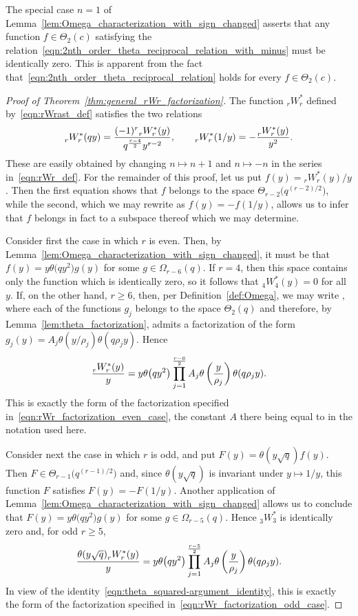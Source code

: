\documentclass[pdftex]{sigma}
\numberwithin{equation}{section}
\begin{document}
\begin{Remark}
The special case $n=1$ of Lemma~\ref{lem:Omega_characterization_with_sign_changed} asserts that any function $f \in \Theta_2(c)$ satisfying the relation~\eqref{eqn:2nth_order_theta_reciprocal_relation_with_minus} must be identically zero. This is apparent from the fact that~\eqref{eqn:2nth_order_theta_reciprocal_relation} holds for every $f \in \Theta_2(c)$.
\end{Remark}

\begin{proof}[Proof of Theorem~\ref{thm:general_rWr_factorization}]
The function $_r^{} W_r^\ast$ defined by~\eqref{eqn:rWrast_def} satisfies the two relations
\[%
_r^{}W_r^\ast(qy) = {(-1)^r {}_r^{}W_r^\ast(y) \over q^{r-4 \over 2} y^{r-2}}, \qquad{} _r^{}W_r^\ast(1/y) = -{ {}_r^{}W_r^\ast(y) \over y^2}.
\]
These are easily obtained by changing $n \mapsto n+1$ and $n \mapsto -n$ in the series in~\eqref{eqn:rWr_def}. For the remainder of this proof, let us put $f(y) = {}_r^{}W_r^\ast(y)/y$. Then the first equation shows that $f$ belongs to the space $\Theta_{r-2}\bigl(q^{(r-2)/2}\bigr)$, while the second, which we may rewrite as $f(y)=-f(1/y)$, allows us to infer that $f$ belongs in fact to a subspace thereof which we may determine.

Consider first the case in which $r$ is even. Then, by Lemma~\ref{lem:Omega_characterization_with_sign_changed}, it must be that $f(y)=y\theta\bigl(qy^2\bigr)g(y)$ for some $g \in \Omega_{r-6}(q)$. If $r=4$, then this space contains only the function which is identically zero, so it follows that $_4^{}W_4^\ast(y)=0$ for all $y$. If, on the other hand, $r \geq 6$, then, per Definition~\ref{def:Omega}, we may write , where each of the functions $g_j$ belongs to the space $\Theta_2(q)$ and therefore, by Lemma~\ref{lem:theta_factorization}, admits a factorization of the form~${g_j(y) = A_j \theta(y/\rho_j)\theta(q\rho_j y)}$. Hence
\[ {_r^{}W_r^\ast(y) \over y} = y\theta\bigl(qy^2\bigr) \prod_{j=1}^{r-6 \over 2} A_j \theta\left({y \over \rho_j}\right)\theta(q\rho_j y). \]
This is exactly the form of the factorization specified in~\eqref{eqn:rWr_factorization_even_case}, the constant $A$ there being equal to  in the notation used here.

Consider next the case in which $r$ is odd, and put $F(y)\! =\! \theta(y\sqrt{q}) f(y)$. Then $F \!\in \!\Theta_{r-1}\bigl(q^{(r-1)/2}\bigr)$ and, since $\theta(y\sqrt{q})$ is invariant under $y \mapsto 1/y$, this function $F$ satisfies $F(y)=-F(1/y)$. Another application of Lemma~\ref{lem:Omega_characterization_with_sign_changed} allows us to conclude that $F(y) = y\theta\bigl(qy^2\bigr)g(y)$ for some $g \in \Omega_{r-5}(q)$. Hence $_3^{}W_3^\ast$ is identically zero and, for odd $r \geq 5$,
\[ {\theta(y\sqrt{q}) {}_r^{}W_r^\ast(y) \over y} = y\theta\bigl(qy^2\bigr) \prod_{j=1}^{r-5 \over 2} A_j \theta\left({y \over \rho_j}\right)\theta(q\rho_j y). \]
In view of the identity~\eqref{eqn:theta_squared-argument_identity}, this is exactly the form of the factorization specified in~\eqref{eqn:rWr_factorization_odd_case}.
\end{proof}
\end{document}
